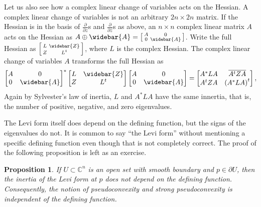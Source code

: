\documentclass[12pt,openany]{book}
\newcommand{\C}{{\mathbb{C}}}
\theoremstyle{plain}
\newtheorem{prop}[thm]{Proposition}
\theoremstyle{remark}
\theoremstyle{definition}
\theoremstyle{exercise}
\theoremstyle{example}
\begin{document}
Let us also see how a complex linear change of variables
acts on the Hessian.  A complex linear change of variables is not an
arbitrary $2n \times 2n$ matrix.  If the Hessian is in the
basis of $\frac{\partial}{\partial z}$s and
$\frac{\partial}{\partial \bar{z}}$s as above,
an $n \times n$ complex linear matrix $A$
acts on the Hessian as $A \oplus \widebar{A} =
\left[ \begin{smallmatrix} A & 0 \\ 0 & \widebar{A} \end{smallmatrix}
\right]$.
Write the full Hessian as
$\left[ \begin{smallmatrix} L & \widebar{Z} \\ Z & L^t \end{smallmatrix}
\right]$, where $L$ is the complex Hessian.  The complex linear change
of variables $A$ transforms
the full Hessian as
\begin{equation*}
{\begin{bmatrix} A & 0 \\ 0 & \widebar{A} \end{bmatrix}}^*
\begin{bmatrix} L & \widebar{Z} \\ Z & L^t \end{bmatrix}
\begin{bmatrix} A & 0 \\ 0 & \widebar{A} \end{bmatrix}
=
\begin{bmatrix} A^*LA & \overline{A^tZA} \\ A^tZA & {(A^*LA)}^t \end{bmatrix} ,
\end{equation*}
Again by Sylvester's law of inertia,
$L$ and $A^*LA$ have the same innertia, that is,
the number of positive, negative, and zero eigenvalues.

The Levi form itself does depend on the defining function, but the signs of
the eigenvalues do not.  It is common to say ``the
Levi form'' without mentioning a specific defining function
even though that is not completely correct.
The proof of the following proposition is left as an exercise.

\begin{prop} \label{prop:inertiainvariant}
If $U \subset \C^n$ is an open set with smooth boundary and $p \in \partial
U$, then the inertia of the Levi form at $p$
does not depend on the defining function.
Consequently, the notion of pseudoconvexity and strong pseudoconvexity is
independent of the defining function.
\end{prop}
\end{document}
